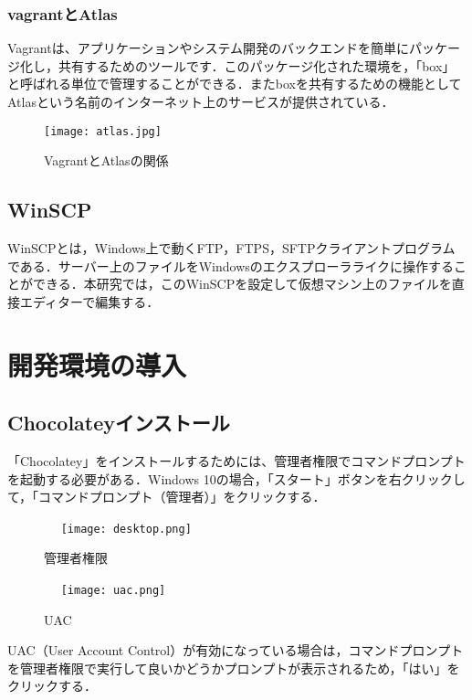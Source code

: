 \subsection{vagrantとAtlas}
Vagrantは、アプリケーションやシステム開発のバックエンドを簡単にパッケージ化し，共有するためのツールです．このパッケージ化された環境を，「box」と呼ばれる単位で管理することができる．またboxを共有するための機能としてAtlasという名前のインターネット上のサービスが提供されている．
\begin{figure}[htb]
\centering
\texttt{[image: atlas.jpg]}
\caption{VagrantとAtlasの関係}
\end{figure}
\newpage

\section{WinSCP}
WinSCPとは，Windows上で動くFTP，FTPS，SFTPクライアントプログラムである．サーバー上のファイルをWindowsのエクスプローラライクに操作することができる．本研究では，このWinSCPを設定して仮想マシン上のファイルを直接エディターで編集する．










\chapter{開発環境の導入}
\section{Chocolateyインストール}
「Chocolatey」をインストールするためには、管理者権限でコマンドプロンプトを起動する必要がある．Windows 10の場合，「スタート」ボタンを右クリックして，「コマンドプロンプト（管理者）」をクリックする．
\begin{figure}[htb]
\centering　
\texttt{[image: desktop.png]}
\caption{管理者権限}\label{tab:desktop}
\end{figure}


\begin{figure}[htb]
\centering　
\texttt{[image: uac.png]}
\caption{UAC}\label{tab:uac}
\end{figure}
\newpage

UAC（User Account Control）が有効になっている場合は，コマンドプロンプトを管理者権限で実行して良いかどうかプロンプトが表示されるため，「はい」をクリックする．



